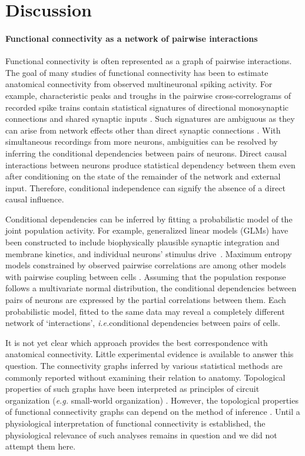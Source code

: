 \documentclass[10pt]{article}
\newcommand{\sq}[1]{\lq#1\rq}
\newcommand{\ie}{\emph{i.e.}\;}
\begin{document}
\section*{Discussion}
\paragraph{Functional connectivity as a network of pairwise interactions}
Functional connectivity is often represented as a graph of pairwise interactions. The goal of many studies of functional connectivity has been to estimate  anatomical connectivity from  observed multineuronal spiking activity.  For example, characteristic peaks and troughs in the pairwise cross-correlograms of recorded spike trains contain statistical signatures of directional monosynaptic connections and shared synaptic inputs \cite{Gerstein:1964, Perkel:1967, Moore:1970, Alonso:1998, Denman:2013}.  Such signatures are ambiguous as they can arise from network effects other than direct synaptic connections \cite{Aertsen:1989}.  With simultaneous recordings from more neurons, ambiguities can be resolved by inferring the conditional dependencies between pairs of neurons.  Direct causal interactions between neurons produce statistical dependency between them even after conditioning on the state of the remainder of the network and external input. Therefore, conditional independence can signify the absence of a direct causal influence.  

Conditional dependencies can be inferred by fitting a probabilistic model of the joint population activity. For example, generalized linear models (GLMs) have been constructed to  include biophysically plausible synaptic integration and membrane kinetics, and individual neurons' stimulus drive~\cite{Pillow:2008}.  Maximum entropy models constrained by observed pairwise correlations are among other models with pairwise coupling between cells \cite{Schneidman:2006, Tkacik:2006, Yu:2008, Tang:2008, Shlens:2009}.  Assuming that the population response follows a multivariate normal distribution, the conditional dependencies between pairs of neurons are expressed by the partial correlations between them.   Each probabilistic model, fitted to the same data may reveal a completely different network of \sq{interactions},  \ie conditional dependencies between pairs of cells. 

It is not yet clear which approach provides the best correspondence with anatomical connectivity. Little experimental evidence is available to answer this question.  The connectivity graphs inferred by various statistical methods are commonly reported without examining their relation to anatomy.  
Topological properties of such graphs have been interpreted as principles of circuit organization (\emph{e.g.} small-world organization) \cite{Feldt:2011, Yu:2008, Malmersjo:2013, Sadovsky:2014}.  However, the topological properties of functional connectivity graphs can depend on the method of inference \cite{Zalesky:2012}. Until a physiological interpretation of functional connectivity is established, the physiological relevance of such analyses remains in question and we did not attempt them here.
\end{document}
